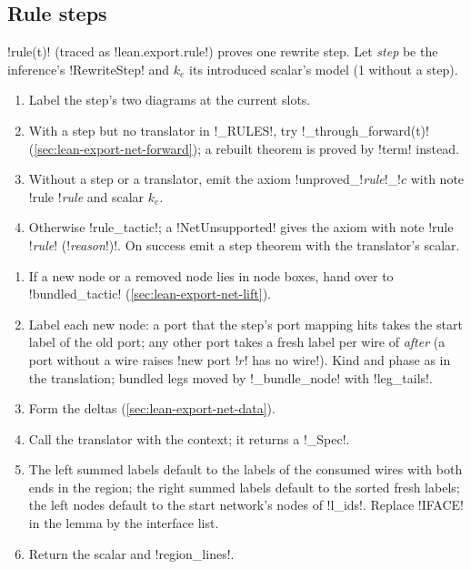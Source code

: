 {\subsection{Rule steps}\label{sec:lean-export-net-rule}

\py!rule(t)! (traced as \code!lean.export.rule!) proves one rewrite step. Let \textit{step} be
the inference's \py!RewriteStep! and $k_e$ its introduced scalar's model (1 without a step).

\begin{algorithm}[\py!rule!]\label{alg:lean-export-net-rule}
\begin{enumerate}
\item Label the step's two diagrams at the current slots.
\item With a step but no translator in \py!_RULES!, try \py!_through_forward(t)!
  (\cref{sec:lean-export-net-forward}); a rebuilt theorem is proved by \py!term! instead.
\item Without a step or a translator, emit the axiom \code!unproved_!\textit{rule}\code!_!$c$
  with note \code!rule !\textit{rule} and scalar $k_e$.
\item Otherwise \py!rule_tactic!; a \py!NetUnsupported! gives the axiom with note
  \code!rule !\textit{rule}\code! (!\textit{reason}\code!)!. On success emit a step theorem with
  the translator's scalar.
\end{enumerate}
\end{algorithm}

\begin{algorithm}\label{alg:lean-export-net-rule-tactic}
\begin{enumerate}
\item If a new node or a removed node lies in node boxes, hand over to \py!bundled_tactic!
  (\cref{sec:lean-export-net-lift}).
\item Label each new node: a port that the step's port mapping hits takes the start label of the
  old port; any other port takes a fresh label per wire of \textit{after} (a port without a wire
  raises \code!new port !$r$\code! has no wire!). Kind and phase as in the translation; bundled
  legs moved by \py!_bundle_node! with \py!leg_tails!.
\item Form the deltas (\cref{sec:lean-export-net-data}).
\item Call the translator with the context; it returns a \py!_Spec!.
\item The left summed labels default to the labels of the consumed wires with both ends in the
  region; the right summed labels default to the sorted fresh labels; the left nodes default to
  the start network's nodes of \py!l_ids!. Replace \code!IFACE! in the lemma by the interface
  list.
\item Return the scalar and \py!region_lines!.
\end{enumerate}
\end{algorithm}

}
